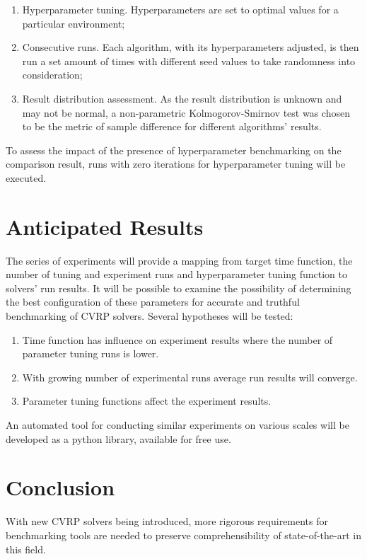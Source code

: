 \documentclass[a4paper,12pt]{report}
\begin{document}
{\begin{enumerate}
    \item Hyperparameter tuning. Hyperparameters are set to optimal values for a particular environment;
    \item Consecutive runs. Each algorithm, with its hyperparameters adjusted, is then run a set amount of times with different seed values to take randomness into consideration;
    \item Result distribution assessment. As the result distribution is unknown and may not be normal, a non-parametric Kolmogorov-Smirnov test was chosen to be the metric of sample difference for different algorithms' results.
\end{enumerate}

To assess the impact of the presence of hyperparameter benchmarking on the comparison result, runs with zero iterations for hyperparameter tuning will be executed.

\section{Anticipated Results}

The series of experiments will provide a mapping from target time function, the number of tuning and experiment runs and hyperparameter tuning function to solvers' run results. It will be possible to examine the possibility of determining the best configuration of these parameters for accurate and truthful benchmarking of CVRP solvers.
Several hypotheses will be tested: 

\begin{enumerate}
    \item Time function has influence on experiment results where the number of parameter tuning runs is lower.
    \item With growing number of experimental runs average run results will converge.
    \item Parameter tuning functions affect the experiment results.
\end{enumerate}

An automated tool for conducting similar experiments on various scales will be developed as a python library, available for free use.

\section{Conclusion}

With new CVRP solvers being introduced, more rigorous requirements for benchmarking tools are needed to preserve comprehensibility of state-of-the-art in this field.

}
\end{document}
